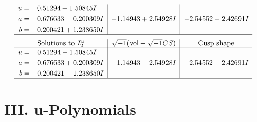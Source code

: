 \documentclass[1p]{elsarticle_modified}
\theoremstyle{definition}
\newcommand{\I}{\sqrt{-1}}
\begin{document}
$$\begin{array}{c|c|c}
\begin{aligned}
u &= \phantom{-}0.51294 + 1.50845 I \\
a &= \phantom{-}0.676633 - 0.200309 I \\
b &= \phantom{-}0.200421 + 1.238650 I\end{aligned}
 & -1.14943 + 2.54928 I & -2.54552 - 2.42691 I\\
 \hline 
 \end{array}$$\newpage$$\begin{array}{c|c|c}  
\text{Solutions to }I^u_{2}& \I (\text{vol} + \sqrt{-1}CS) & \text{Cusp shape}\\
 \hline 
\begin{aligned}
u &= \phantom{-}0.51294 - 1.50845 I \\
a &= \phantom{-}0.676633 + 0.200309 I \\
b &= \phantom{-}0.200421 - 1.238650 I\end{aligned}
 & -1.14943 - 2.54928 I & -2.54552 + 2.42691 I\\
 \hline 
 \end{array}$$\newpage
\newpage\renewcommand{\arraystretch}{1}
\centering \section*{ III. u-Polynomials}
\end{document}
